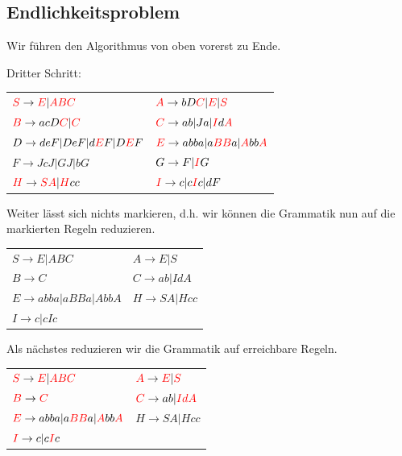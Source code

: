 \documentclass{article}
\begin{document}
\subsection*{Endlichkeitsproblem}
Wir führen den Algorithmus von oben vorerst zu Ende.
\begin{center}
Dritter Schritt:\\
\begin{tabular}{ll}
${\color{red}S} \rightarrow {\color{red}E} | {\color{red}ABC}$  & ${\color{red}A} \rightarrow bD{\color{red}C} | {\color{red}E} | {\color{red}S}$ \\
${\color{red}B} \rightarrow acD{\color{red}C} | {\color{red}C}$ & ${\color{red}C} \rightarrow ab | Ja | {\color{red}I}d{\color{red}A}$ \\
$D \rightarrow deF | DeF | d{\color{red}E}F | D{\color{red}E}F$ & ${\color{red}E} \rightarrow abba | a{\color{red}BB}a | {\color{red}A}bb{\color{red}A}$ \\
$F \rightarrow JcJ | GJ | bG$                                   & $G \rightarrow F | {\color{red}I}G$ \\
${\color{red}H} \rightarrow {\color{red}SA} | {\color{red}H}cc$ & ${\color{red}I} \rightarrow c | c{\color{red}I}c | dF$
\end{tabular}
\end{center}
Weiter lässt sich nichts markieren, d.h. wir können die Grammatik nun auf die markierten Regeln reduzieren.
\begin{center}
\begin{tabular}{ll}
$S \rightarrow E | ABC$            & $A \rightarrow E | S$ \\
$B \rightarrow C$                  & $C \rightarrow ab | IdA$ \\
$E \rightarrow abba | aBBa | AbbA$ & $H \rightarrow SA | Hcc$ \\
$I \rightarrow c | cIc$            & \\
\end{tabular}
\end{center}
Als nächstes reduzieren wir die Grammatik auf erreichbare Regeln.
\begin{center}
\begin{tabular}{ll}
${\color{red}S} \rightarrow {\color{red}E} | {\color{red}ABC}$                         & ${\color{red}A} \rightarrow {\color{red}E} | {\color{red}S}$ \\
${\color{red}B} \rightarrow {\color{red}C}$                                            & ${\color{red}C} \rightarrow ab | {\color{red}IdA}$ \\
${\color{red}E} \rightarrow abba | a{\color{red}BB}a | {\color{red}A}bb{\color{red}A}$ & $H \rightarrow SA | Hcc$ \\
${\color{red}I} \rightarrow c | c{\color{red}I}c$                                      & \\
\end{tabular}
\end{center}
\end{document}
